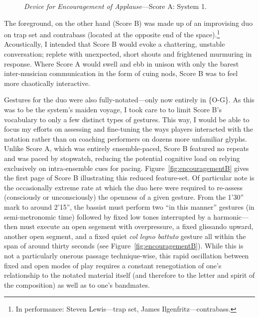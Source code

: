     \begin{figure}
        \centering
        \captionsetup{width=.5\textwidth}
        \caption{\textit{Device for Encouragement of Applause}---Score A: System 1.}
        \label{fig:encouragementA}
    \end{figure}
    
    The foreground, on the other hand (Score B) was made up of an improvising duo on trap set and contrabass (located at the opposite end of the space).\footnote{In performance: Steven Lewis---trap set, James Ilgenfritz---contrabass.} Acoustically, I intended that Score B would evoke a chattering, unstable conversation; replete with unexpected, short shouts and frightened murmuring in response. Where Score A would swell and ebb in unison with only the barest inter-musician communication in the form of cuing nods, Score B was to feel more chaotically interactive.
    
    Gestures for the duo were also fully-notated---only now entirely in \{O-G\}. As this was to be the system's maiden voyage, I took care to to limit Score B's vocabulary to only a few distinct types of gestures. This way, I would be able to focus my efforts on assessing and fine-tuning the ways players interacted with the notation rather than on coaching performers on dozens more unfamiliar glyphs. Unlike Score A, which was entirely ensemble-paced, Score B featured no repeats and was paced by stopwatch, reducing the potential cognitive load on relying exclusively on intra-ensemble cues for pacing. Figure~\ref{fig:encouragementB} gives the first page of Score B illustrating this reduced feature-set. Of particular note is the occasionally extreme rate at which the duo here were required to re-assess (consciously or unconsciously) the openness of a given gesture. From the 1'30'' mark to around 2'15'', the bassist must perform two ``in this manner'' gestures (in semi-metronomic time) followed by fixed low tones interrupted by a harmonic---then must execute an open segement with overpressure, a fixed glissando upward, another open segment, and a fixed quiet \textit{col legno battuto} gesture all within the span of around thirty seconds (see Figure~\ref{fig:encouragementB}). While this is not a particularly onerous passage technique-wise, this rapid oscillation between fixed and open modes of play requires a constant renegotiation of one's relationship to the notated material itself (and therefore to the letter and spirit of the composition) as well as to one's bandmates.
    
